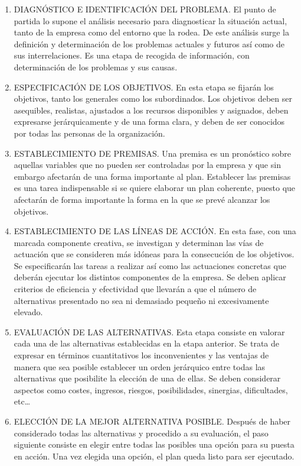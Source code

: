 \documentclass[
]{krantz}
\providecommand{\tightlist}{%
  \setlength{\itemsep}{0pt}\setlength{\parskip}{0pt}}
\begin{document}
\begin{enumerate}
\def\labelenumi{\arabic{enumi}.}
\tightlist
\item
  DIAGNÓSTICO E IDENTIFICACIÓN DEL PROBLEMA. El punto de partida lo supone el análisis necesario para diagnosticar la situación actual, tanto de la empresa como del entorno que la rodea. De este análisis surge la definición y determinación de los problemas actuales y futuros así como de sus interrelaciones. Es una etapa de recogida de información, con determinación de los problemas y sus causas.
\item
  ESPECIFICACIÓN DE LOS OBJETIVOS. En esta etapa se fijarán los objetivos, tanto los generales como los subordinados. Los objetivos deben ser asequibles, realistas, ajustados a los recursos disponibles y asignados, deben expresarse jerárquicamente y de una forma clara, y deben de ser conocidos por todas las personas de la organización.
\item
  ESTABLECIMIENTO DE PREMISAS. Una premisa es un pronóstico sobre aquellas variables que no pueden ser controladas por la empresa y que sin embargo afectarán de una forma importante al plan. Establecer las premisas es una tarea indispensable si se quiere elaborar un plan coherente, puesto que afectarán de forma importante la forma en la que se prevé alcanzar los objetivos.
\item
  ESTABLECIMIENTO DE LAS LÍNEAS DE ACCIÓN. En esta fase, con una marcada componente creativa, se investigan y determinan las vías de actuación que se consideren más idóneas para la consecución de los objetivos. Se especificarán las tareas a realizar así como las actuaciones concretas que deberán ejecutar los distintos componentes de la empresa. Se deben aplicar criterios de eficiencia y efectividad que llevarán a que el número de alternativas presentado no sea ni demasiado pequeño ni excesivamente elevado.
\item
  EVALUACIÓN DE LAS ALTERNATIVAS. Esta etapa consiste en valorar cada una de las alternativas establecidas en la etapa anterior. Se trata de expresar en términos cuantitativos los inconvenientes y las ventajas de manera que sea posible establecer un orden jerárquico entre todas las alternativas que posibilite la elección de una de ellas. Se deben considerar aspectos como costes, ingresos, riesgos, posibilidades, sinergias, dificultades, etc\ldots{}
\item
  ELECCIÓN DE LA MEJOR ALTERNATIVA POSIBLE. Después de haber considerado todas las alternativas y procedido a su evaluación, el paso siguiente consiste en elegir entre todas las posibles una opción para su puesta en acción. Una vez elegida una opción, el plan queda listo para ser ejecutado.

\end{enumerate}
\end{document}
